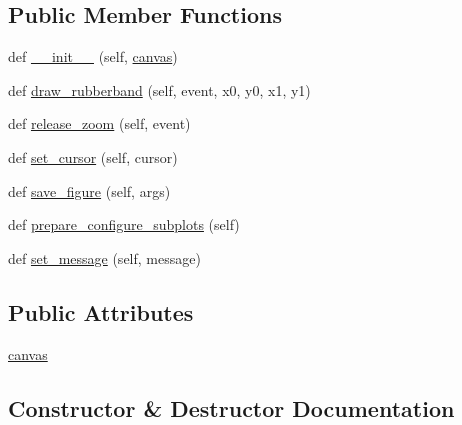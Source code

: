 \subsection*{Public Member Functions}
\begin{DoxyCompactItemize}
\item 
def \hyperlink{classmatplotlib_1_1backends_1_1backend__macosx_1_1NavigationToolbar2Mac_a837e2c23588f65bd55cf99ba9cee0b21}{\+\_\+\+\_\+init\+\_\+\+\_\+} (self, \hyperlink{classmatplotlib_1_1backends_1_1backend__macosx_1_1NavigationToolbar2Mac_a1e3c01efeca1b0975db8707fa03a9be1}{canvas})
\item 
def \hyperlink{classmatplotlib_1_1backends_1_1backend__macosx_1_1NavigationToolbar2Mac_a2bc01acfe41ba634595317aad3011544}{draw\+\_\+rubberband} (self, event, x0, y0, x1, y1)
\item 
def \hyperlink{classmatplotlib_1_1backends_1_1backend__macosx_1_1NavigationToolbar2Mac_a75617bcab985f2559878835b56643f41}{release\+\_\+zoom} (self, event)
\item 
def \hyperlink{classmatplotlib_1_1backends_1_1backend__macosx_1_1NavigationToolbar2Mac_a1e67a3adc17d220df978173b5454e16a}{set\+\_\+cursor} (self, cursor)
\item 
def \hyperlink{classmatplotlib_1_1backends_1_1backend__macosx_1_1NavigationToolbar2Mac_ae7931f408edd8348b401385b53122347}{save\+\_\+figure} (self, args)
\item 
def \hyperlink{classmatplotlib_1_1backends_1_1backend__macosx_1_1NavigationToolbar2Mac_a9be97b83a6517cda3fa1f54230103002}{prepare\+\_\+configure\+\_\+subplots} (self)
\item 
def \hyperlink{classmatplotlib_1_1backends_1_1backend__macosx_1_1NavigationToolbar2Mac_a7ae3a577fbc968d72cbd2eeec1da22e8}{set\+\_\+message} (self, message)
\end{DoxyCompactItemize}
\subsection*{Public Attributes}
\begin{DoxyCompactItemize}
\item 
\hyperlink{classmatplotlib_1_1backends_1_1backend__macosx_1_1NavigationToolbar2Mac_a1e3c01efeca1b0975db8707fa03a9be1}{canvas}
\end{DoxyCompactItemize}


\subsection{Constructor \& Destructor Documentation}
\mbox{\label{classmatplotlib_1_1backends_1_1backend__macosx_1_1NavigationToolbar2Mac_a837e2c23588f65bd55cf99ba9cee0b21}} 
